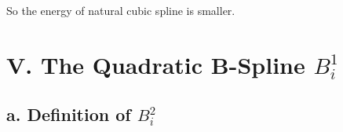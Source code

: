 \documentclass[a4paper]{article}
\begin{document}
So the energy of natural cubic spline is smaller.







\section*{V. The Quadratic B-Spline $B_{i} ^{1}$}

\subsection*{a. Definition of $B_{i} ^{2}$}
\end{document}
